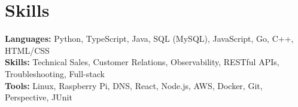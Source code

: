 \documentclass[11pt]{article}       %
\begin{document}
\vspace{-18.5pt}

\section*{Skills}
\textbf{Languages:} Python, TypeScript, Java, SQL (MySQL), JavaScript, Go, C++, HTML/CSS\\
\textbf{Skills:} Technical Sales, Customer Relations, Observability, RESTful APIs, Troubleshooting, Full-stack\\
\textbf{Tools:} Linux, Raspberry Pi, DNS, React, Node.js, AWS, Docker, Git, Perspective, JUnit\\

\vspace{-6.5pt}
\end{document}

